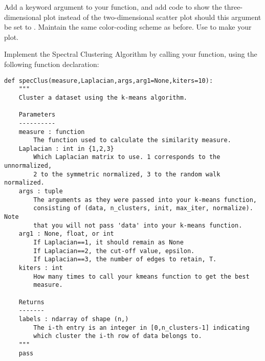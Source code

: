 Add a keyword argument  to your  function, and add code to show the three-dimensional plot instead of the two-dimensional scatter plot should this argument be set to .  Maintain the same color-coding scheme as before.  Use  to make your plot.

Implement the Spectral Clustering Algorithm by calling your  function, using the following function declaration:
\begin{lstlisting}
def specClus(measure,Laplacian,args,arg1=None,kiters=10):
    """
    Cluster a dataset using the k-means algorithm.

    Parameters
    ----------
    measure : function
        The function used to calculate the similarity measure.
    Laplacian : int in {1,2,3}
        Which Laplacian matrix to use. 1 corresponds to the unnormalized,
        2 to the symmetric normalized, 3 to the random walk normalized.
    args : tuple
        The arguments as they were passed into your k-means function,
        consisting of (data, n_clusters, init, max_iter, normalize). Note
        that you will not pass 'data' into your k-means function.
    arg1 : None, float, or int
        If Laplacian==1, it should remain as None
        If Laplacian==2, the cut-off value, epsilon.
        If Laplacian==3, the number of edges to retain, T.
    kiters : int
        How many times to call your kmeans function to get the best
        measure.

    Returns
    -------
    labels : ndarray of shape (n,)
        The i-th entry is an integer in [0,n_clusters-1] indicating
        which cluster the i-th row of data belongs to.
    """
    pass
\end{lstlisting}

